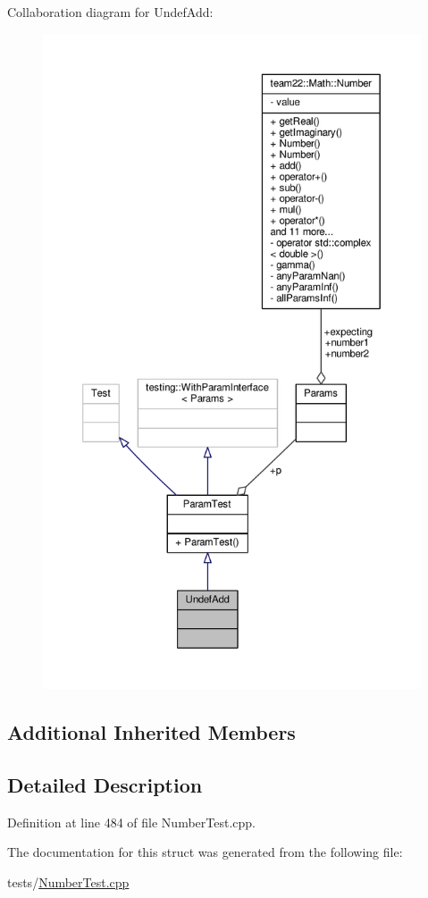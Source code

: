 Collaboration diagram for Undef\+Add\+:
\nopagebreak
\begin{figure}[H]
\begin{center}
\leavevmode
\includegraphics[height=550pt]{struct_undef_add__coll__graph}
\end{center}
\end{figure}
\subsection*{Additional Inherited Members}


\subsection{Detailed Description}


Definition at line 484 of file Number\+Test.\+cpp.



The documentation for this struct was generated from the following file\+:\begin{DoxyCompactItemize}
\item 
tests/\hyperlink{_number_test_8cpp}{Number\+Test.\+cpp}\end{DoxyCompactItemize}

